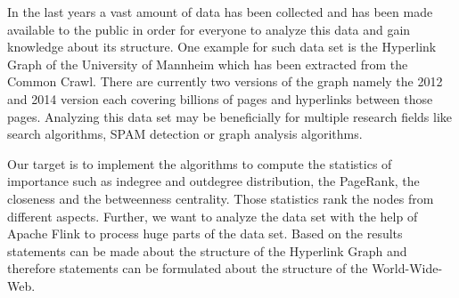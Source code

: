 In the last years a vast amount of data has been collected and has been made available to the public in order for everyone to analyze this data and gain knowledge about its structure. One example for such data set is the Hyperlink Graph of the University of Mannheim which has been extracted from the Common Crawl. There are currently two versions of the graph namely the 2012 and 2014 version each covering billions of pages and hyperlinks between those pages. Analyzing this data set may be beneficially for multiple research fields like  search algorithms, SPAM detection or graph analysis algorithms.  
 
Our target is to implement the algorithms to compute the statistics of importance such as indegree and outdegree distribution, the PageRank, the closeness and the betweenness centrality. Those statistics rank the nodes from different aspects. Further, we want to analyze the data set with the help of Apache Flink to process huge parts of the data set. Based on the results statements can be made about the structure of the Hyperlink Graph and therefore  statements can be formulated about the structure of the World-Wide-Web.